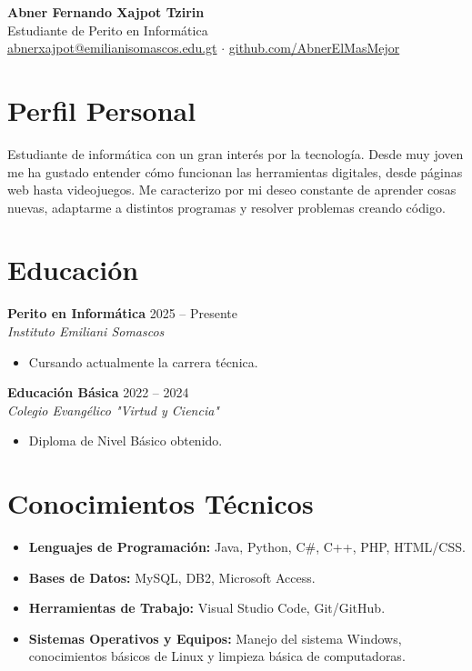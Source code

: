 \documentclass[11pt,a4paper]{article}
\begin{document}
\begin{center}
    {\Huge \bfseries Abner Fernando Xajpot Tzirin}\\[0.4em]
    {\large \color{graytext} Estudiante de Perito en Informática}\\[0.6em]
    \href{mailto:abnerxajpot@emilianisomascos.edu.gt}{abnerxajpot@emilianisomascos.edu.gt} $\cdot$ 
    \href{https://github.com/AbnerElMasMejor}{github.com/AbnerElMasMejor}
\end{center}

\vspace{0.5em}

\section{Perfil Personal}
Estudiante de informática con un gran interés por la tecnología. Desde muy joven me ha gustado entender cómo funcionan las herramientas digitales, desde páginas web hasta videojuegos. Me caracterizo por mi deseo constante de aprender cosas nuevas, adaptarme a distintos programas y resolver problemas creando código.

\section{Educación}

\textbf{Perito en Informática} \hfill 2025 -- Presente \\
\textit{Instituto Emiliani Somascos}
\begin{itemize}[leftmargin=1.5em, itemsep=2pt]
    \item Cursando actualmente la carrera técnica.
\end{itemize}

\vspace{0.3em}

\textbf{Educación Básica} \hfill 2022 -- 2024 \\
\textit{Colegio Evangélico "Virtud y Ciencia"}
\begin{itemize}[leftmargin=1.5em, itemsep=2pt]
    \item Diploma de Nivel Básico obtenido.
\end{itemize}

\section{Conocimientos Técnicos}
\begin{itemize}[leftmargin=1.5em, itemsep=4pt]
    \item \textbf{Lenguajes de Programación:} Java, Python, C\#, C++, PHP, HTML/CSS.
    \item \textbf{Bases de Datos:} MySQL, DB2, Microsoft Access.
    \item \textbf{Herramientas de Trabajo:} Visual Studio Code, Git/GitHub.
    \item \textbf{Sistemas Operativos y Equipos:} Manejo del sistema Windows, conocimientos básicos de Linux y limpieza básica de computadoras.
\end{itemize}
\end{document}
